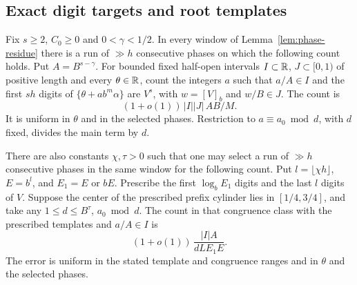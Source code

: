 \subsection{Exact digit targets and root templates}

\begin{theorem}\label{thm:selectable-counts}
Fix \(s\ge2\), \(C_0\ge0\) and \(0<\gamma<1/2\). In every window
of Lemma~\ref{lem:phase-residue} there is a run of \(\gg h\)
consecutive phases on which the following count holds. Put
\(A=B^{s-\gamma}\). For bounded fixed half-open intervals
\(I\subset\mathbb R\), \(J\subset[0,1)\) of positive length and every
\(\theta\in\mathbb R\), count the integers \(a\) such that \(a/A\in I\)
and the first \(sh\) digits of \(\{\theta+a b^m\alpha\}\) are
\(V^s\), with \(w=[V]_b\) and \(w/B\in J\). The count is
\begin{equation}\label{eq:exact-power-count}
        (1+o(1))\,|I||J|\,AB/M .
\end{equation}
It is uniform in \(\theta\) and in the selected phases. Restriction
to \(a\equiv a_0\bmod d\), with \(d\) fixed, divides the main term
by \(d\).

There are also constants \(\chi,\tau>0\) such that one may select
a run of \(\gg h\) consecutive phases in the same window for the
following count. Put \(l=\lfloor\chi h\rfloor\), \(E=b^l\), and
\(E_1=E\) or \(bE\). Prescribe the first \(\log_b E_1\) digits and
the last \(l\) digits of \(V\). Suppose the center of the prescribed
prefix cylinder lies in \([1/4,3/4]\), and take any
\(1\le d\le B^\tau\), \(a_0\bmod d\). The count in that congruence
class with the prescribed templates and \(a/A\in I\) is
\begin{equation}\label{eq:exact-template-count}
        (1+o(1))\,\frac{|I|A}{d L E_1 E}.
\end{equation}
The error is uniform in the stated template and congruence ranges
and in \(\theta\) and the selected phases.
\end{theorem}

